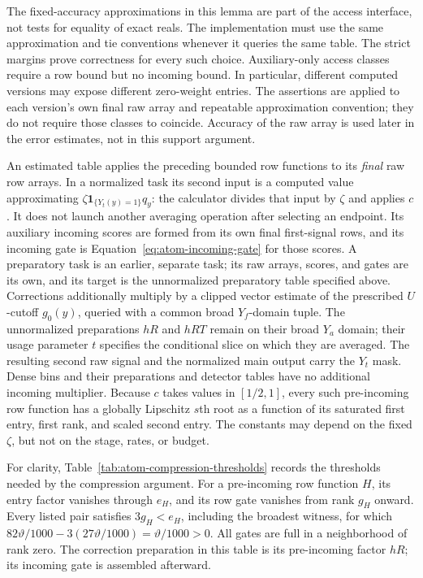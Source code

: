 The fixed-accuracy approximations in this lemma are part of the access
interface, not tests for equality of exact reals.  The implementation
must use the same approximation and tie conventions whenever it queries
the same table.  The strict margins prove correctness for every such
choice.  Auxiliary-only access classes require a row bound but no
incoming bound.
In particular, different computed versions may expose different
zero-weight entries.  The assertions are applied to each version's own
final raw array and repeatable approximation convention; they do not
require those classes to coincide.  Accuracy of the raw array is used
later in the error estimates, not in this support argument.


An estimated table applies the preceding bounded row functions to its
\emph{final} raw row arrays.  In a normalized task its second input is a
computed value approximating $\zeta\mathbf1_{\{Y_t(y)=1\}}q_y$: the
calculator divides that input by $\zeta$ and applies $c$.  It does not launch another averaging
operation after selecting an endpoint.  Its auxiliary incoming scores
are formed from its own final first-signal rows, and its incoming gate
is Equation~\eqref{eq:atom-incoming-gate} for those scores.  A preparatory
task is an earlier, separate task; its raw arrays, scores, and gates are
its own, and its target is the unnormalized preparatory table specified
above.  Corrections additionally multiply by a clipped vector estimate
of the prescribed $U$-cutoff $g_0(y)$, queried with a common broad
$Y_f$-domain tuple.  The unnormalized preparations $hR$ and $hRT$
remain on their broad $Y_a$ domain; their usage parameter $t$ specifies
the conditional slice on which they are averaged.  The resulting
second raw signal and the normalized main output carry the $Y_t$ mask.
Dense bins and their preparations and detector tables have
no additional incoming multiplier.
Because $c$ takes values in $[1/2,1]$, every such pre-incoming row
function has a globally Lipschitz $s$th root as a function of its
saturated first entry, first rank, and scaled second entry.  The constants
may depend on the fixed $\zeta$, but not on the stage, rates, or budget.

For clarity, Table~\ref{tab:atom-compression-thresholds} records the
thresholds needed by the compression argument.  For a pre-incoming row
function $H$, its entry factor vanishes through $e_H$, and its row gate
vanishes from rank $g_H$ onward.  Every listed pair satisfies
$3g_H<e_H$, including the broadest witness, for which
$82\vartheta/1000-3(27\vartheta/1000)=\vartheta/1000>0$.
All gates are full in a neighborhood of rank zero.  The correction
preparation in this table is its pre-incoming factor $hR$; its incoming
gate is assembled afterward.

